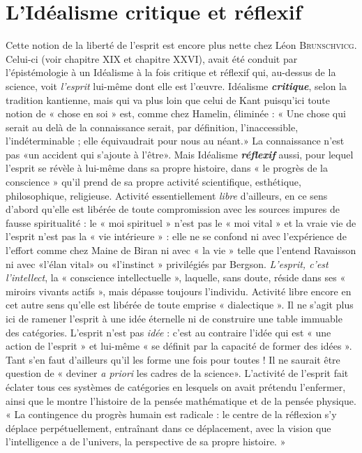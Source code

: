 \section{L’Idéalisme critique et réflexif}%
Cette notion de la
liberté de l’esprit est encore plus nette chez Léon \textsc{Brunschvicg}.
Celui-ci (voir chapitre XIX et chapitre XXVI), avait été conduit
par l’épistémologie à un Idéalisme à la fois critique et réflexif qui,
au-dessus de la science, voit {\it l’esprit} lui-même dont elle est l’œuvre.
Idéalisme \textbf{\textit {critique}}, selon la tradition kantienne, mais qui va plus
loin que celui de Kant puisqu’ici toute notion de « chose en soi » est,
comme chez Hamelin, éliminée : « Une chose qui serait au delà de
la connaissance serait, par définition, l’inaccessible, l’indéterminable ;
elle équivaudrait pour nous au néant.» La connaissance n’est pas
«un accident qui s’ajoute à l'être». Mais Idéalisme \textbf{\textit {réflexif}} aussi,
pour lequel l'esprit se révèle à lui-même dans sa propre histoire, dans
« le progrès de la conscience » qu’il prend de sa propre activité scientifique,
esthétique, philosophique, religieuse. Activité essentiellement
{\it libre} d’ailleurs, en ce sens d’abord qu’elle est libérée de toute compromission
avec les sources impures de fausse spiritualité : le « moi
spirituel » n’est pas le « moi vital » et la vraie vie de l’esprit n’est pas la
« vie intérieure » : elle ne se confond ni avec l’expérience de l'effort
comme chez Maine de Biran ni avec « la vie » telle que l’entend Ravaisson
ni avec «l'élan vital» ou «l'instinct » privilégiés par Bergson.
{\it L'esprit, c’est l’intellect}, la « conscience intellectuelle », laquelle, sans
doute, réside dans ses « miroirs vivants actifs », mais dépasse toujours
l'individu. Activité libre encore en cet autre sens qu’elle est libérée
de toute emprise « dialectique ». Il ne s’agit plus ici de ramener l'esprit
à une idée éternelle ni de construire une table immuable des catégories.
L’esprit n’est pas {\it idée} : c’est au contraire l’idée qui est « une
action de l’esprit » et lui-même « se définit par la capacité de former
des idées ». Tant s’en faut d’ailleurs qu’il les forme une fois pour
toutes ! Il ne saurait être question de « deviner {\it a priori} les cadres de
la science». L'activité de l'esprit fait éclater tous ces systèmes
de catégories en lesquels on avait prétendu l’enfermer, ainsi que le
montre l’histoire de la pensée mathématique et de la pensée physique.
« La contingence du progrès humain est radicale : le centre de la
réflexion s’y déplace perpétuellement, entraînant dans ce déplacement,
avec la vision que l'intelligence a de l’univers, la perspective
de sa propre histoire. »

